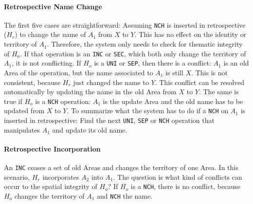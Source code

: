 
\paragraph{Retrospective Name Change} %
\label{par:retrospective_name_change}

The first five cases are straightforward: Assuming \texttt{NCH} is inserted in retrospective ($H_r$) to change the name of $A_1$ from $X$ to $Y$. This has no effect on the identity or territory of $A_1$. Therefore, the system only needs to check for thematic integrity of $H_o$. If that operation is an \texttt{INC} or \texttt{SEC}, which both only change the territory of $A_1$, it is not conflicting. If $H_o$ is a \texttt{UNI} or \texttt{SEP}, then there is a conflict: $A_1$ is an old Area of the operation, but the name associated to $A_1$ is still $X$. This is not consistent, because $H_r$ just changed the name to $Y$. This conflict can be resolved automatically by updating the name in the old Area from $X$ to $Y$. The same is true if $H_o$ is a \texttt{NCH} operation: $A_1$ is the update Area and the old name has to be updated from $X$ to $Y$. To summarize what the system has to do if a \texttt{NCH} on $A_1$ is inserted in retrospective: Find the next \texttt{UNI}, \texttt{SEP} or \texttt{NCH} operation that manipulates $A_1$ and update its old name.


\paragraph{Retrospective Incorporation} %
\label{par:retrospective_incorporation}

An \texttt{INC} ceases a set of old Areas and changes the territory of one Area. In this scenario, $H_r$ incorporates $A_2$ into $A_1$. The question is what kind of conflicts can occur to the spatial integrity of $H_o$? If $H_o$ is  a \texttt{NCH}, there is no conflict, because $H_o$ changes the territory of $A_1$ and \texttt{NCH} the name.

